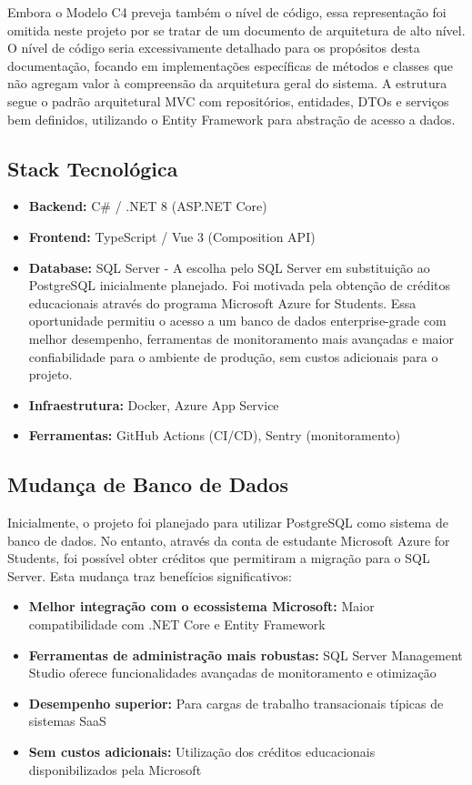 \documentclass[a4paper,12pt]{article}
\begin{document}
Embora o Modelo C4 preveja também o nível de código, essa representação foi omitida neste projeto por se tratar de um documento de arquitetura de alto nível. O nível de código seria excessivamente detalhado para os propósitos desta documentação, focando em implementações específicas de métodos e classes que não agregam valor à compreensão da arquitetura geral do sistema. A estrutura segue o padrão arquitetural MVC com repositórios, entidades, DTOs e serviços bem definidos, utilizando o Entity Framework para abstração de acesso a dados.

\subsection{Stack Tecnológica}
\begin{itemize}[nosep]
  \item \textbf{Backend:} C\# / .NET 8 (ASP.NET Core)
  \item \textbf{Frontend:} TypeScript / Vue 3 (Composition API)
  \item \textbf{Database:} SQL Server - A escolha pelo SQL Server em substituição ao PostgreSQL inicialmente planejado. Foi motivada pela obtenção de créditos educacionais através do programa Microsoft Azure for Students. Essa oportunidade permitiu o acesso a um banco de dados enterprise-grade com melhor desempenho, ferramentas de monitoramento mais avançadas e maior confiabilidade para o ambiente de produção, sem custos adicionais para o projeto.
  \item \textbf{Infraestrutura:} Docker, Azure App Service
  \item \textbf{Ferramentas:} GitHub Actions (CI/CD), Sentry (monitoramento)
\end{itemize}

\subsection{Mudança de Banco de Dados}
Inicialmente, o projeto foi planejado para utilizar PostgreSQL como sistema de banco de dados. No entanto, através da conta de estudante Microsoft Azure for Students, foi possível obter créditos que permitiram a migração para o SQL Server. Esta mudança traz benefícios significativos:

\begin{itemize}[nosep]
  \item \textbf{Melhor integração com o ecossistema Microsoft:} Maior compatibilidade com .NET Core e Entity Framework
  \item \textbf{Ferramentas de administração mais robustas:} SQL Server Management Studio oferece funcionalidades avançadas de monitoramento e otimização
  \item \textbf{Desempenho superior:} Para cargas de trabalho transacionais típicas de sistemas SaaS
  \item \textbf{Sem custos adicionais:} Utilização dos créditos educacionais disponibilizados pela Microsoft
\end{itemize}
\end{document}
